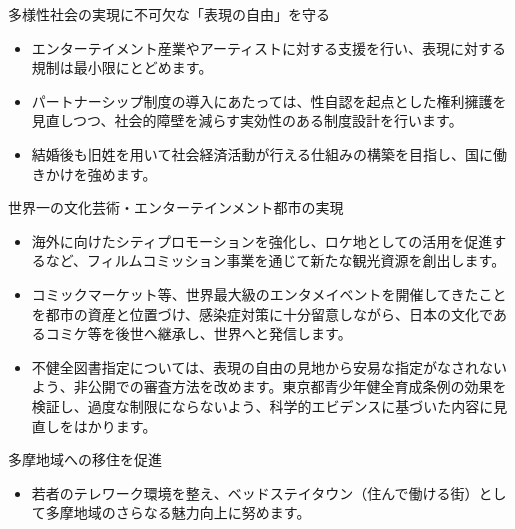 \documentclass[dvipdfmx]{beamer}
\begin{document}
    \begin{frame}{多様性社会の実現に不可欠な「表現の自由」を守る}{}
        \begin{small}
            \begin{itemize}
                \setlength{\itemsep}{2mm}
                \item エンターテイメント産業やアーティストに対する支援を行い、表現に対する規制は最小限にとどめます。
                \item パートナーシップ制度の導入にあたっては、性自認を起点とした権利擁護を見直しつつ、社会的障壁を減らす実効性のある制度設計を行います。
                \item 結婚後も旧姓を用いて社会経済活動が行える仕組みの構築を目指し、国に働きかけを強めます。
            \end{itemize}
        \end{small}
    \end{frame}

    \begin{frame}{世界一の文化芸術・エンターテインメント都市の実現}{}
        \begin{small}
            \begin{itemize}
                \setlength{\itemsep}{2mm}
                \item 海外に向けたシティプロモーションを強化し、ロケ地としての活用を促進するなど、フィルムコミッション事業を通じて新たな観光資源を創出します。
                \item コミックマーケット等、世界最大級のエンタメイベントを開催してきたことを都市の資産と位置づけ、感染症対策に十分留意しながら、日本の文化であるコミケ等を後世へ継承し、世界へと発信します。
                \item 不健全図書指定については、表現の自由の見地から安易な指定がなされないよう、非公開での審査方法を改めます。東京都青少年健全育成条例の効果を検証し、過度な制限にならないよう、科学的エビデンスに基づいた内容に見直しをはかります。
            \end{itemize}
        \end{small}
    \end{frame}

    \begin{frame}{多摩地域への移住を促進}{}
        \begin{small}
            \begin{itemize}
                \setlength{\itemsep}{2mm}
                \item 若者のテレワーク環境を整え、ベッドステイタウン（住んで働ける街）として多摩地域のさらなる魅力向上に努めます。
            \end{itemize}
        \end{small}
    \end{frame}
\end{document}
